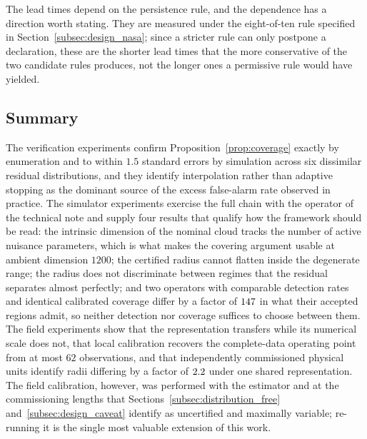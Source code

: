\documentclass[a4paper]{cas-sc}
\begin{document}
The lead times depend on the persistence rule, and the dependence has a
direction worth stating. They are measured under the eight-of-ten rule
specified in Section~\ref{subsec:design_nasa}; since a stricter rule can only
postpone a declaration, these are the shorter lead times that the more
conservative of the two candidate rules produces, not the longer ones a
permissive rule would have yielded.

\subsection{Summary}
\label{subsec:results_summary}

The verification experiments confirm Proposition~\ref{prop:coverage} exactly
by enumeration and to within \(1.5\) standard errors by simulation across six
dissimilar residual distributions, and they identify interpolation rather than
adaptive stopping as the dominant source of the excess false-alarm rate
observed in practice. The simulator experiments exercise the full chain with
the operator of the technical note and supply four results that qualify how
the framework should be read: the intrinsic dimension of the nominal cloud
tracks the number of active nuisance parameters, which is what makes the
covering argument usable at ambient dimension \(1200\); the certified radius
cannot flatten inside the degenerate range; the radius does not discriminate
between regimes that the residual separates almost perfectly; and two
operators with comparable detection rates and identical calibrated coverage
differ by a factor of \(147\) in what their accepted regions admit, so
neither detection nor coverage suffices to choose between them. The field
experiments show that the representation transfers while
its numerical scale does not, that local calibration recovers the
complete-data operating point from at most \(62\) observations, and that
independently commissioned physical units identify radii differing by a factor
of \(2.2\) under one shared representation. The field calibration, however,
was performed with the estimator and at the commissioning lengths that
Sections~\ref{subsec:distribution_free} and~\ref{subsec:design_caveat}
identify as uncertified and maximally variable; re-running it is the single
most valuable extension of this work.
\end{document}
